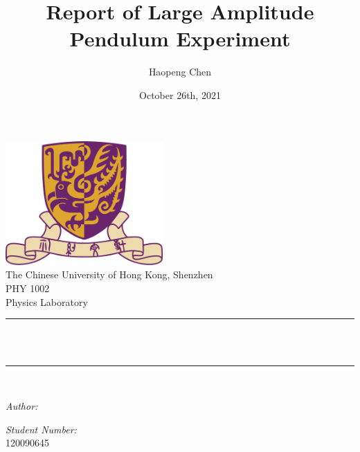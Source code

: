 \title{Report of Large Amplitude Pendulum Experiment} %
\author{Haopeng Chen}%
\date{October 26th, 2021}%





\begin{titlepage}
  \centering
  \vspace*{0.5 cm}
  \includegraphics[scale = 0.75,width=6cm]{CUHK}\\[1.0 cm]   %
  \textnormal{\large The Chinese University of Hong Kong, Shenzhen}\\[2.0 cm]
  \textnormal{\Large PHY 1002}\\[0.5 cm]
  \textnormal{\large Physics Laboratory}\\[0.5 cm]               %
  \rule{\linewidth}{0.2 mm} \\[0.4 cm]
  { \huge \bfseries \thetitle}\\
  \rule{\linewidth}{0.2 mm} \\[1.5 cm]

  \begin{minipage}{0.4\textwidth}
    \begin{flushleft} \large
      \emph{Author:}\\
      \theauthor
    \end{flushleft}
  \end{minipage}
  \begin{minipage}{0.4\textwidth}
    \begin{flushright} \large
      \emph{Student Number:} \\
      120090645  %
    \end{flushright}
  \end{minipage}\\[2 cm]
  {\large \thedate}\\[2 cm]

  \vfill

\end{titlepage}

